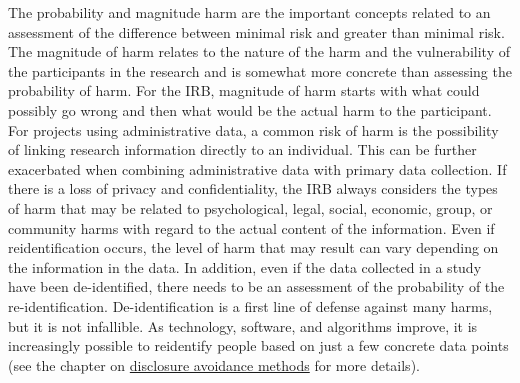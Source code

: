 \documentclass[
]{book}
\begin{document}
The probability and magnitude harm are the important concepts related to an assessment of the difference between minimal risk and greater than minimal risk. The magnitude of harm relates to the nature of the harm and the vulnerability of the participants in the research and is somewhat more concrete than assessing the probability of harm. For the IRB, magnitude of harm starts with what could possibly go wrong and then what would be the actual harm to the participant. For projects using administrative data, a common risk of harm is the possibility of linking research information directly to an individual. This can be further exacerbated when combining administrative data with primary data collection. If there is a loss of privacy and confidentiality, the IRB always considers the types of harm that may be related to psychological, legal, social, economic, group, or community harms with regard to the actual content of the information. Even if reidentification occurs, the level of harm that may result can vary depending on the information in the data. In addition, even if the data collected in a study have been de-identified, there needs to be an assessment of the probability of the re-identification. De-identification is a first line of defense against many harms, but it is not infallible. As technology, software, and algorithms improve, it is increasingly possible to reidentify people based on just a few concrete data points (see the chapter on \protect\hyperlink{discavoid}{disclosure avoidance methods} for more details).
\end{document}
